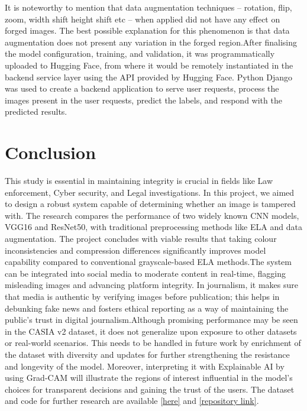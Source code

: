 \documentclass{ieeeaccess}
\begin{document}
 
 It is noteworthy to mention that data augmentation techniques – rotation, flip, zoom, width shift height shift etc – when applied did not have any effect on forged images. The best possible explanation for this phenomenon is that data augmentation does not present any variation in the forged region.After finalising the model configuration, training, and validation, it was programmatically uploaded to Hugging Face, from where it would be remotely instantiated in the backend service layer using the API provided by Hugging Face. Python Django was used to create a backend application to serve user requests, process the images present in the user requests, predict the labels, and respond with the predicted results.
  


\section{Conclusion}
This study is essential in maintaining integrity is crucial in fields like Law enforcement, Cyber security, and Legal investigations. In this project, we aimed to design a robust system capable of determining whether an image is tampered with. The research compares the performance of two widely known CNN models, VGG16 and ResNet50, with traditional preprocessing methods like ELA and data augmentation. The project concludes with viable results that taking colour inconsistencies and compression differences significantly improves model capability compared to conventional grayscale-based ELA methods.The system can be integrated into social media to moderate content in real-time, flagging misleading images and advancing platform integrity. In journalism, it makes sure that media is authentic by verifying images before publication; this helps in debunking fake news and fosters ethical reporting as a way of maintaining the public's trust in digital journalism.Although promising performance may be seen in the CASIA v2 dataset, it does not generalize upon exposure to other datasets or real-world scenarios. This needs to be handled in future work by enrichment of the dataset with diversity and updates for further strengthening the resistance and longevity of the model. Moreover, interpreting it with Explainable AI by using Grad-CAM will illustrate the regions of interest influential in the model's choices for transparent decisions and gaining the trust of the users.
The dataset and code for further research are available \href{https://www.kaggle.com/datasets/divg07/casia-20-image-tampering-detection-dataset/data}{[here]} and \href{https://github.com/ayaz168/veriforge}{[repository link]}.
\end{document}

